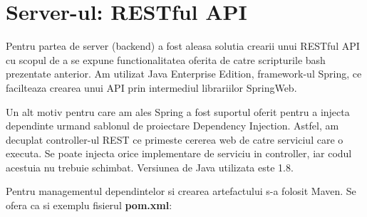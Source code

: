 \section{Server-ul: RESTful API}
Pentru partea de server (backend) a fost aleasa solutia crearii unui RESTful API cu scopul de a se expune functionalitatea oferita de catre scripturile bash prezentate anterior. Am utilizat Java Enterprise Edition, framework-ul Spring, ce facilteaza crearea unui API prin intermediul librariilor SpringWeb.
\par
Un alt motiv pentru care am ales Spring a fost suportul oferit pentru a injecta dependinte urmand sablonul de proiectare Dependency Injection. Astfel, am decuplat controller-ul REST ce primeste cererea web de catre serviciul care o executa. Se poate injecta orice implementare de serviciu in controller, iar codul acestuia nu trebuie schimbat. Versiunea de Java utilizata este 1.8.
\newpage
Pentru managementul dependintelor si crearea artefactului s-a folosit Maven. Se ofera ca si exemplu fisierul \textbf{pom.xml}:

\newpage
